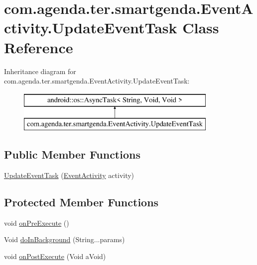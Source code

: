 \hypertarget{classcom_1_1agenda_1_1ter_1_1smartgenda_1_1_event_activity_1_1_update_event_task}{\section{com.\-agenda.\-ter.\-smartgenda.\-Event\-Activity.\-Update\-Event\-Task Class Reference}
\label{classcom_1_1agenda_1_1ter_1_1smartgenda_1_1_event_activity_1_1_update_event_task}
}
Inheritance diagram for com.\-agenda.\-ter.\-smartgenda.\-Event\-Activity.\-Update\-Event\-Task\-:\begin{figure}[H]
\begin{center}
\leavevmode
\includegraphics[height=2.000000cm]{classcom_1_1agenda_1_1ter_1_1smartgenda_1_1_event_activity_1_1_update_event_task}
\end{center}
\end{figure}
\subsection*{Public Member Functions}
\begin{DoxyCompactItemize}
\item 
\hyperlink{classcom_1_1agenda_1_1ter_1_1smartgenda_1_1_event_activity_1_1_update_event_task_ad70c87f0ab53a459b3865ca4c9ce7acc}{Update\-Event\-Task} (\hyperlink{classcom_1_1agenda_1_1ter_1_1smartgenda_1_1_event_activity}{Event\-Activity} activity)
\end{DoxyCompactItemize}
\subsection*{Protected Member Functions}
\begin{DoxyCompactItemize}
\item 
void \hyperlink{classcom_1_1agenda_1_1ter_1_1smartgenda_1_1_event_activity_1_1_update_event_task_a2c7d5bd8e051f5375cd76bc40f0724fd}{on\-Pre\-Execute} ()
\item 
Void \hyperlink{classcom_1_1agenda_1_1ter_1_1smartgenda_1_1_event_activity_1_1_update_event_task_af4f283d7dd35b8018961bd704c488432}{do\-In\-Background} (String...\-params)
\item 
void \hyperlink{classcom_1_1agenda_1_1ter_1_1smartgenda_1_1_event_activity_1_1_update_event_task_a210b573cbe2f78f960c265e84908bfaf}{on\-Post\-Execute} (Void a\-Void)
\end{DoxyCompactItemize}


